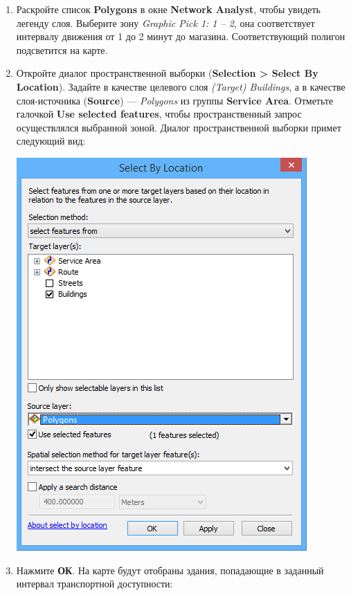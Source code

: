 \documentclass[]{book}
\theoremstyle{definition}
\theoremstyle{definition}
\theoremstyle{definition}
\theoremstyle{remark}
\begin{document}
\begin{enumerate}
\def\labelenumi{\arabic{enumi}.}
\item
  Раскройте список \textbf{Polygons} в окне \textbf{Network Analyst},
  чтобы увидеть легенду слоя. Выберите зону \emph{Graphic Pick 1: 1 --
  2}, она соответствует интервалу движения от 1 до 2 минут до магазина.
  Соответствующий полигон подсветится на карте.
\item
  Откройте диалог пространственной выборки (\textbf{Selection
  \textgreater{} Select By Location}). Задайте в качестве целевого слоя
  \emph{(Target) Buildings}, а в качестве слоя-источника
  (\textbf{Source}) --- \emph{Polygons} из группы \textbf{Service Area}.
  Отметьте галочкой \textbf{Use selected features}, чтобы
  пространственный запрос осуществлялся выбранной зоной. Диалог
  пространственной выборки примет следующий вид:

  \includegraphics{images/Ex12/image18.png}
\item
  Нажмите \textbf{ОК}. На карте будут отобраны здания, попадающие в
  заданный интервал транспортной доступности:


\end{enumerate}
\end{document}
